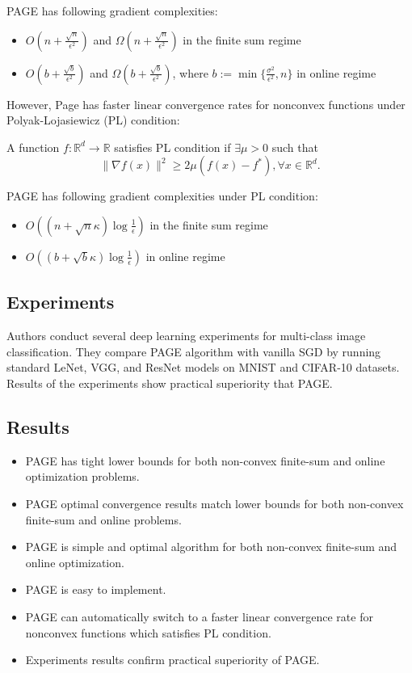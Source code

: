 \documentclass{article}
\begin{document}
PAGE has following gradient complexities:
\begin{itemize}
  \item \(O(n+\frac{\sqrt{n}}{\epsilon^2})\) and 
  \(\Omega(n+\frac{\sqrt{n}}{\epsilon^2})\) 
  in the finite sum regime
  \item \(O(b+\frac{\sqrt{b}}{\epsilon^2})\) and
  \(\Omega(b+\frac{\sqrt{b}}{\epsilon^2})\), where \(b:=\min\{\frac{\sigma^2}{\epsilon^2}, n\}\)  in online regime
\end{itemize}
However, Page has faster linear convergence rates for nonconvex functions under Polyak-Lojasiewicz
(PL) condition:

A function \(f: \mathbb{R}^d \rightarrow \mathbb{R}\) satisfies PL condition if \(\exists \mu > 0\)
such that
\[\|\nabla f(x)\|^2 \geq 2\mu (f(x)-f^*), \forall x \in \mathbb{R}^d.\]

PAGE has following gradient complexities under PL condition:
\begin{itemize}
  \item \(O((n+\sqrt{n}\kappa)\log\frac{1}{\epsilon})\) in the finite sum regime
  \item \(O((b+\sqrt{b}\kappa)\log\frac{1}{\epsilon})\) in online regime
\end{itemize}

\subsection{Experiments}

Authors conduct several deep learning experiments for multi-class image classification.
They compare PAGE algorithm with vanilla SGD by running standard LeNet, VGG, and ResNet 
models on MNIST and CIFAR-10 datasets. Results of the experiments show practical 
superiority that PAGE. 

\subsection{Results}

\begin{itemize}
  \item PAGE has tight lower bounds for both non-convex finite-sum and online optimization problems.
  \item PAGE optimal convergence results match lower bounds for both non-convex finite-sum and online problems.
  \item PAGE is simple and optimal algorithm for both non-convex finite-sum and online optimization. 
  \item PAGE is easy to implement.
  \item PAGE can automatically switch to a faster linear 
  convergence rate for nonconvex functions which satisfies PL condition.
  \item Experiments results confirm practical superiority of PAGE.
\end{itemize}
\end{document}
